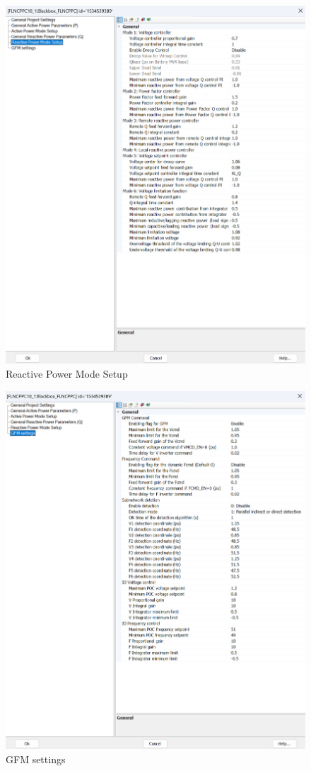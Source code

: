 \documentclass{../grid-link-report}
\begin{document}
		\begin{figure}[H]
		\centering
		\includegraphics[width=\textwidth]{report-assets/images/Reactive Power Mode Setup.png}
		\caption{Reactive Power Mode Setup}
		\label{fig:Reactive Power Mode Setup}
	\end{figure}
	
		\begin{figure}[H]
		\centering
		\includegraphics[width=\textwidth]{report-assets/images/GFM settings.png}
		\caption{GFM settings}
		\label{fig:GFM settings}
	\end{figure}
	
	
	\makebackpage
\end{document}
